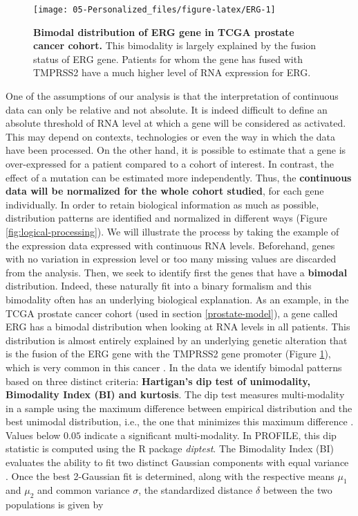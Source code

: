 \documentclass[a4paper,12pt,twoside,onecolumn,openright,final,oldfontcommands]{memoir}
\begin{document}
\begin{figure}

{\centering \texttt{[image: 05-Personalized\_files/figure-latex/ERG-1]} 

}

\caption[Bimodal distribution of ERG gene in TCGA prostate cancer cohort]{\textbf{Bimodal distribution of ERG gene in TCGA
prostate cancer cohort.} This bimodality is largely explained by the
fusion status of ERG gene. Patients for whom the gene has fused with
TMPRSS2 have a much higher level of RNA expression for ERG.}\label{fig:ERG}
\end{figure}






One of the assumptions of our analysis is that the interpretation of
continuous data can only be relative and not absolute. It is indeed
difficult to define an absolute threshold of RNA level at which a gene
will be considered as activated. This may depend on contexts,
technologies or even the way in which the data have been processed. On
the other hand, it is possible to estimate that a gene is over-expressed
for a patient compared to a cohort of interest. In contrast, the effect
of a mutation can be estimated more independently. Thus, the
\textbf{continuous data will be normalized for the whole cohort
studied}, for each gene individually. In order to retain biological
information as much as possible, distribution patterns are identified
and normalized in different ways (Figure \ref{fig:logical-processing}).
We will illustrate the process by taking the example of the expression
data expressed with continuous RNA levels. Beforehand, genes with no
variation in expression level or too many missing values are discarded
from the analysis. Then, we seek to identify first the genes that have a
\textbf{bimodal} distribution. Indeed, these naturally fit into a binary
formalism and this bimodality often has an underlying biological
explanation. As an example, in the TCGA prostate cancer cohort (used in
section \ref{prostate-model}), a gene called ERG has a bimodal
distribution when looking at RNA levels in all patients. This
distribution is almost entirely explained by an underlying genetic
alteration that is the fusion of the ERG gene with the TMPRSS2 gene
promoter (Figure \ref{fig:ERG}), which is very common in this cancer
\citep{tomlins2005recurrent}. In the data we identify bimodal patterns
based on three distinct criteria: \textbf{Hartigan's dip test of
unimodality, Bimodality Index (BI) and kurtosis}. The dip test measures
multi-modality in a sample using the maximum difference between
empirical distribution and the best unimodal distribution, i.e., the one
that minimizes this maximum difference \citep{hartigan1985dip}. Values
below \(0.05\) indicate a significant multi-modality. In PROFILE, this
dip statistic is computed using the R package \emph{diptest}. The
Bimodality Index (BI) evaluates the ability to fit two distinct Gaussian
components with equal variance \citep{wang2009bimodality}. Once the best
2-Gaussian fit is determined, along with the respective means \(\mu_1\)
and \(\mu_2\) and common variance \(\sigma\), the standardized distance
\(\delta\) between the two populations is given by
\end{document}
